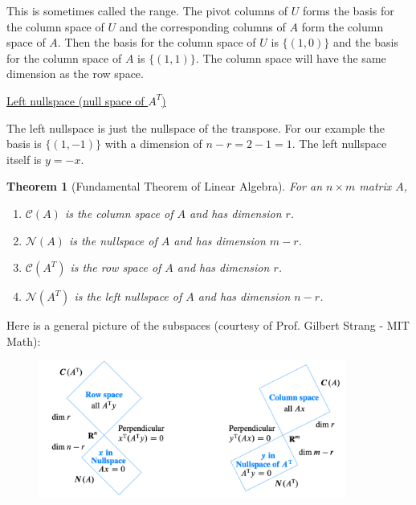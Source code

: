 \documentclass[reqno]{amsart}
\newtheorem{thm}{Theorem}
\theoremstyle{definition}
\begin{document}
This is sometimes called the range.  The pivot columns of $U$ forms the basis for the column space of $U$
and the corresponding columns of $A$ form the column space of $A$.  Then the basis for the column space
of $U$ is $\{(1,0)\}$ and the basis for the column space of $A$ is $\{(1, 1)\}$.  The column space will
have the same dimension as the row space.

\underline{Left nullspace (null space of $A^T$)}

The left nullspace is just the nullspace of the transpose.  For our example the basis is $\{(1, -1)\}$
with a dimension of $n - r = 2 - 1 = 1$.  The left nullspace itself is $y = -x$.

\begin{thm}[Fundamental Theorem of Linear Algebra]
For an $n \times m$ matrix $A$,

\begin{enumerate}

\item  $\mathcal{C}(A)$ is the column space of $A$ and has dimension $r$.

\item  $\mathcal{N}(A)$ is the nullspace of $A$ and has dimension $m-r$.

\item  $\mathcal{C}(A^T)$ is the row space of $A$ and has dimension $r$.

\item  $\mathcal{N}(A^T)$ is the left nullspace of $A$ and has dimension $n-r$.

\end{enumerate}
\end{thm}

Here is a general picture of the subspaces (courtesy of Prof. Gilbert Strang - MIT Math):
%
\begin{figure}[htbp]
\centering
\includegraphics[width = 0.9\textwidth]{Subspaces}
\end{figure}

\pagebreak
\end{document}
